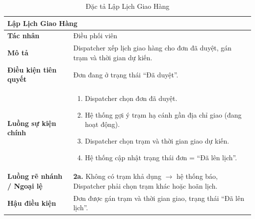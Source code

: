 \begin{table}[H]
  \centering
  \begin{tabularx}{\textwidth}{|l|X|}
    \hline
    \multicolumn{2}{|l|}{\textbf{Lập Lịch Giao Hàng}} \\
    \hline
    \textbf{Tác nhân}           & Điều phối viên \\ \hline
    \textbf{Mô tả}              & Dispatcher xếp lịch giao hàng cho đơn đã duyệt, gán trạm và thời gian dự kiến. \\ \hline
    \textbf{Điều kiện tiên quyết} & Đơn đang ở trạng thái ``Đã duyệt''. \\ \hline
    \textbf{Luồng sự kiện chính} &
      \begin{enumerate}[leftmargin=*, nosep, topsep=0pt]
        \item Dispatcher chọn đơn đã duyệt.
        \item Hệ thống gợi ý trạm hạ cánh gần địa chỉ giao (đang hoạt động).
        \item Dispatcher chọn trạm và thời gian giao dự kiến.
        \item Hệ thống cập nhật trạng thái đơn = ``Đã lên lịch''.
      \end{enumerate} \\ \hline
    \textbf{Luồng rẽ nhánh / Ngoại lệ} &
      \textbf{2a.} Không có trạm khả dụng $\rightarrow$ hệ thống báo, Dispatcher phải chọn trạm khác hoặc hoãn lịch. \\ \hline
    \textbf{Hậu điều kiện}      & Đơn được gán trạm và thời gian giao, trạng thái ``Đã lên lịch''. \\
    \hline
  \end{tabularx}
  \caption{Đặc tả Lập Lịch Giao Hàng}
  \label{tab:uc05}
\end{table}

